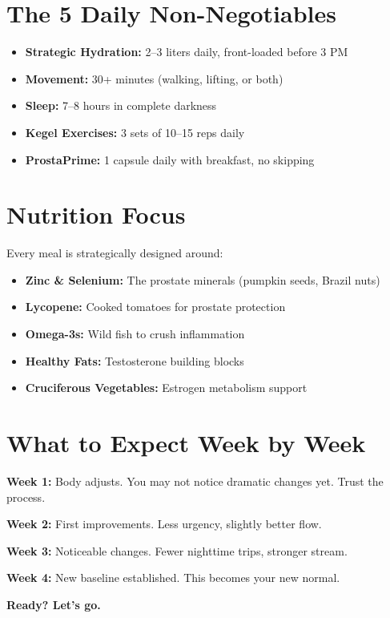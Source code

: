 \documentclass[11pt,oneside]{book}
\begin{document}
\section*{The 5 Daily Non-Negotiables}
\begin{itemize}[leftmargin=*]
\item \textbf{Strategic Hydration:} 2--3 liters daily, front-loaded before 3 PM
\item \textbf{Movement:} 30+ minutes (walking, lifting, or both)
\item \textbf{Sleep:} 7--8 hours in complete darkness
\item \textbf{Kegel Exercises:} 3 sets of 10--15 reps daily
\item \textbf{ProstaPrime:} 1 capsule daily with breakfast, no skipping
\end{itemize}

\section*{Nutrition Focus}
Every meal is strategically designed around:
\begin{itemize}[leftmargin=*]
\item \textbf{Zinc \& Selenium:} The prostate minerals (pumpkin seeds, Brazil nuts)
\item \textbf{Lycopene:} Cooked tomatoes for prostate protection
\item \textbf{Omega-3s:} Wild fish to crush inflammation
\item \textbf{Healthy Fats:} Testosterone building blocks
\item \textbf{Cruciferous Vegetables:} Estrogen metabolism support
\end{itemize}

\section*{What to Expect Week by Week}

\textbf{Week 1:} Body adjusts. You may not notice dramatic changes yet. Trust the process.

\textbf{Week 2:} First improvements. Less urgency, slightly better flow.

\textbf{Week 3:} Noticeable changes. Fewer nighttime trips, stronger stream.

\textbf{Week 4:} New baseline established. This becomes your new normal.

\textbf{Ready? Let's go.}
\end{document}
